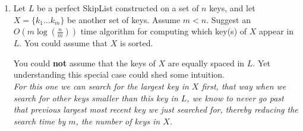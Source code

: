 \documentclass[11pt,epic,leqno,eepic,psfig,]{article}
\newcommand{\ans}[1]{{\color{brown}{\bf\Large Answer:} \sl  #1 \color{black}}}
\renewcommand{\i}{\item}
\begin{document}
\begin{enumerate}
\i Let $L$ be a perfect SkipList constructed on a set of $n$ keys, and let $X=\{k_1\dots k_m\}$ be another  set of keys. Assume $m<n$.  Suggest an $O(m\log({\frac {n }{m}}))$ time  algorithm for computing which key(s) of $X$  appear in $L$.  {\color{brown} You could assume that $X$ is sorted}.



You could {\bf not } assume that the keys of $X$ are equally spaced in $L$. Yet understanding this special case could shed some intuition.
\\\ans{For this one we can search for the largest key in $X$ first, that way when we search for other keys smaller than this key in $L$, we know to never go past that previous largest most recent key we just searched for, thereby reducing the search time by $m$, the number of keys in $X$.}

\end{enumerate}
\end{document}
